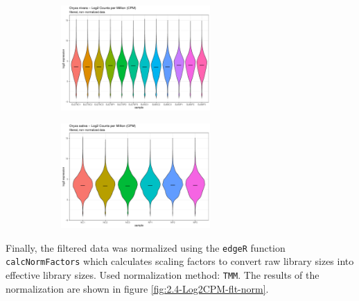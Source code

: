 \begin{figure}[htbp]
    \caption[Log2(CPM) distribution of the filtered, non-normalized data]{Log2(CPM) distribution of the filtered (\(< 1\) CPM in at least half of the samples), non-normalized data}
    \label{fig:2.3-Log2CPM-flt-notnorm}
    \begin{subfigure}[t]{0.64\linewidth}
        \label{fig:2.3-Log2CPM-flt-notnorm-Oryza_nivara}
        \includegraphics[width=\textwidth, height=4cm]{../../results/plots-and-tables/2.3-Log2CPM-flt-notnorm-Oryza_nivara}
    \end{subfigure}
    \begin{subfigure}[t]{0.32\linewidth}
        \label{fig:2.3-Log2CPM-flt-notnorm-Oryza_sativa}
        \includegraphics[width=\textwidth, height=4cm]{../../results/plots-and-tables/2.3-Log2CPM-flt-notnorm-Oryza_sativa}
    \end{subfigure}
\end{figure}

Finally, the filtered data was normalized using the \verb|edgeR| function \verb|calcNormFactors| which calculates scaling factors to convert raw library sizes into effective library sizes. Used normalization method: \verb|TMM|. The results of the normalization are shown in figure \ref{fig:2.4-Log2CPM-flt-norm}.

